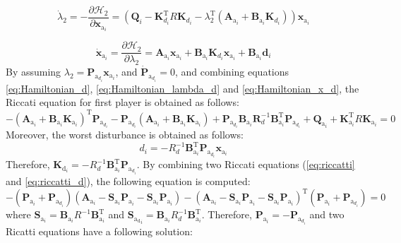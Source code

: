\documentclass[3p]{elsarticle}
\begin{document}
\begin{equation}\label{eq:Hamiltonian_lambda_d}
    \dot{\lambda}_2 = -\dfrac{\partial \mathcal{H}_2}{\partial \mathbf{x}_{\mathrm{a}_i}} = ( \mathbf{Q}_i - 
    \mathbf{K}_{d_i}^\mathrm{T} R \mathbf{K}_{d_i} -\lambda_2^\mathrm{T}(\mathbf{A}_{\mathrm{a}_i} + \mathbf{B}_{\mathrm{a}_i}\mathbf{K}_{d_i})) \mathbf{x}_{\mathrm{a}_i} 
\end{equation}

\begin{equation}\label{eq:Hamiltonian_x_d}
    \dot{\mathbf{x}}_{\mathrm{a}_i}  = \dfrac{\partial \mathcal{H}_2}{\partial \lambda_2} = \mathbf{A}_{\mathrm{a}_i} \mathbf{x}_{\mathrm{a}_i}  +  \mathbf{B}_{\mathrm{a}_i} \mathbf{K}_{d_i} \mathbf{x}_{\mathrm{a}_i} + \mathbf{B}_{\mathrm{a}_i} \mathbf{d}_i 
\end{equation}
By assuming $\lambda_2 = \mathbf{P}_{\mathrm{a}_{d_i}}\mathbf{x}_{\mathrm{a}_i}$, 
 and $\dot{\mathbf{P}}_{\mathrm{a}_{d_i}} = 0$, and combining equations \eqref{eq:Hamiltonian_d}, \eqref{eq:Hamiltonian_lambda_d} and \eqref{eq:Hamiltonian_x_d}, the Riccati equation for first player is obtained as follows:
 \begin{equation}\label{eq:riccatti_d}
    -( \mathbf{A}_{\mathrm{a}_i} + \mathbf{B}_{\mathrm{a}_i}\mathbf{K}_{\mathrm{a}_i})^\mathrm{T} \mathbf{P}_{\mathrm{a}_{d_i}} - \mathbf{P}_{\mathrm{a}_{d_i}} (\mathbf{A}_{\mathrm{a}_i} + \mathbf{B}_{\mathrm{a}_i}\mathbf{K}_{\mathrm{a}_i}) + \mathbf{P}_{\mathrm{a}_{d_i}} \mathbf{B}_{\mathrm{a}_i} \mathbf{R}_d^{-1} \mathbf{B}_{\mathrm{a}_i}^\mathrm{T} \mathbf{P}_{\mathrm{a}_{d_i}} + \mathbf{Q}_{\mathrm{a}_i}  + \mathbf{K}_{\mathrm{a}_i}^\mathrm{T} R \mathbf{K}_{\mathrm{a}_i} = 0
 \end{equation}
 Moreover, the worst disturbance is obtained as follows:
    \begin{equation}
        d_i = -R_d^{-1}\mathbf{B}_{\mathrm{a}_i}^\mathrm{T}\mathbf{P}_{\mathrm{a}_{d_i}}\mathbf{x}_{\mathrm{a}_i}
    \end{equation}
    Therefore, $\mathbf{K}_{\mathrm{d}_i} = -R_d^{-1}\mathbf{B}_{\mathrm{a}_i}^\mathrm{T}\mathbf{P}_{\mathrm{a}_{d_i}}$.
     By combining two Riccati equations (\eqref{eq:riccatti} and \eqref{eq:riccatti_d}), the following equation is computed:
     \begin{equation}
        -(\mathbf{P}_{\mathrm{a}_{i}} + \mathbf{P}_{\mathrm{a}_{d_i}})\left(
        \mathbf{A}_{\mathrm{a}_i} - \mathbf{S}_{\mathrm{a}_i}\mathbf{P}_{\mathrm{a}_{i}} - \mathbf{S}_{\mathrm{a}_i} \mathbf{P}_{\mathrm{a}_i}
        \right) - \left(
        \mathbf{A}_{\mathrm{a}_i}  - \mathbf{S}_{\mathrm{a}_i}\mathbf{P}_{\mathrm{a}_{i}} - \mathbf{S}_{\mathrm{a}_i} \mathbf{P}_{\mathrm{a}_i}
        \right)^\mathrm{T}(\mathbf{P}_{\mathrm{a}_{i}} + \mathbf{P}_{\mathrm{a}_{d_i}})=0
    \end{equation}
    where $\mathbf{S}_{\mathrm{a}_i} = \mathbf{B}_{\mathrm{a}_i}{R}^{-1}\mathbf{B}_{\mathrm{a}_i}^\mathrm{T}$ and $\mathbf{S}_{\mathrm{a_d}_i} = \mathbf{B}_{\mathrm{a}_i}{R}_d^{-1}\mathbf{B}_{\mathrm{a}_i}^\mathrm{T}$. Therefore, $\mathbf{P}_{\mathrm{a}_i} = -\mathbf{P}_{\mathrm{a}_{d_i}}$ and two Ricatti equations have a following solution:
\end{document}
